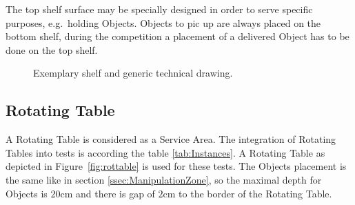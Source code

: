 The top shelf surface may be specially designed in order to serve specific purposes, e.g.\, holding Objects. Objects to pic up are always placed on the bottom shelf, during the competition a placement of a delivered Object has to be done on the top shelf.  



\begin{figure}[h!]
	\centering
	\hspace{0.05\textwidth}
	\caption{Exemplary shelf and generic technical drawing.}%
	\label{fig:shelf}
\end{figure}


\subsection{Rotating Table}\label{sec:Rotating Table}
A Rotating Table is considered as a Service Area. The integration of Rotating Tables into tests is according the table \ref{tab:Instances}.  A Rotating Table as depicted in Figure~\ref{fig:rottable} is used for these tests. The Objects placement is the same like in section \ref{ssec:ManipulationZone}, so the maximal depth for Objects is $20 \si{\centi\meter}$ and there is gap of $2\si{\centi\meter}$ to the border of the Rotating Table.


